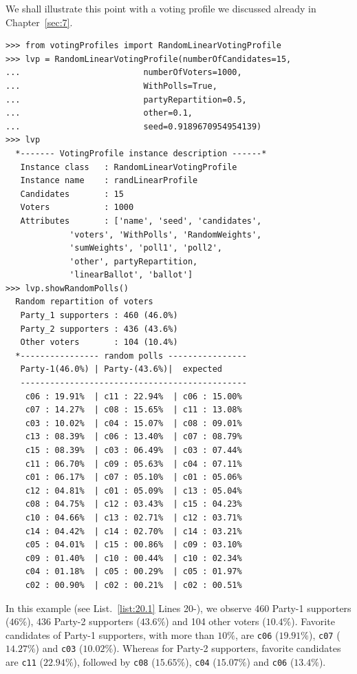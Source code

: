 We shall illustrate this point with a voting profile we discussed already in Chapter~\ref{sec:7}.
\begin{lstlisting}[caption={Example of a 3 parties voting profile},label=list:20.1]
>>> from votingProfiles import RandomLinearVotingProfile
>>> lvp = RandomLinearVotingProfile(numberOfCandidates=15,
...                         numberOfVoters=1000,
...                         WithPolls=True,
...                         partyRepartition=0.5,
...                         other=0.1,
...                         seed=0.9189670954954139)
>>> lvp
  *------- VotingProfile instance description ------*
   Instance class   : RandomLinearVotingProfile
   Instance name    : randLinearProfile
   Candidates       : 15
   Voters           : 1000
   Attributes       : ['name', 'seed', 'candidates',
             'voters', 'WithPolls', 'RandomWeights',
             'sumWeights', 'poll1', 'poll2',
             'other', partyRepartition,
             'linearBallot', 'ballot']
>>> lvp.showRandomPolls()
  Random repartition of voters
   Party_1 supporters : 460 (46.0%)
   Party_2 supporters : 436 (43.6%)
   Other voters       : 104 (10.4%)
  *---------------- random polls ----------------
   Party-1(46.0%) | Party-(43.6%)|  expected  
   ----------------------------------------------
    c06 : 19.91%  | c11 : 22.94%  | c06 : 15.00%
    c07 : 14.27%  | c08 : 15.65%  | c11 : 13.08%
    c03 : 10.02%  | c04 : 15.07%  | c08 : 09.01%
    c13 : 08.39%  | c06 : 13.40%  | c07 : 08.79%
    c15 : 08.39%  | c03 : 06.49%  | c03 : 07.44%
    c11 : 06.70%  | c09 : 05.63%  | c04 : 07.11%
    c01 : 06.17%  | c07 : 05.10%  | c01 : 05.06%
    c12 : 04.81%  | c01 : 05.09%  | c13 : 05.04%
    c08 : 04.75%  | c12 : 03.43%  | c15 : 04.23%
    c10 : 04.66%  | c13 : 02.71%  | c12 : 03.71%
    c14 : 04.42%  | c14 : 02.70%  | c14 : 03.21%
    c05 : 04.01%  | c15 : 00.86%  | c09 : 03.10%
    c09 : 01.40%  | c10 : 00.44%  | c10 : 02.34%
    c04 : 01.18%  | c05 : 00.29%  | c05 : 01.97%
    c02 : 00.90%  | c02 : 00.21%  | c02 : 00.51%
\end{lstlisting}

In this example (see List.~\vref{list:20.1} Lines 20-), we observe 460 Party-1 supporters ($46\%$), 436 Party-2 supporters ($43.6\%$) and 104 other voters ($10.4\%$). Favorite candidates of Party-1 supporters, with more than $10\%$, are \texttt{c06} ($19.91\%$), \texttt{c07} ($14.27\%$) and \texttt{c03} ($10.02\%$). Whereas for Party-2 supporters, favorite candidates are \texttt{c11} ($22.94\%$), followed by \texttt{c08} ($15.65\%$), \texttt{c04} ($15.07\%$) and \texttt{c06} ($13.4\%$).

